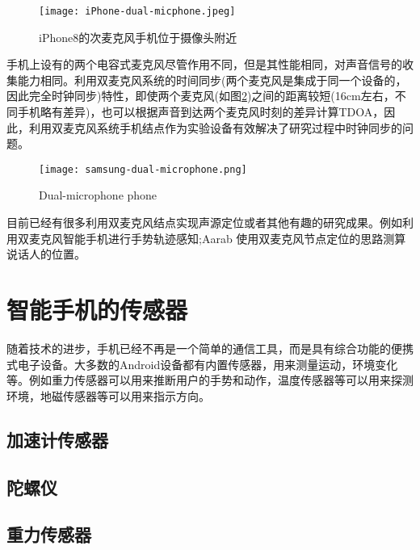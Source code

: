 \documentclass[winfonts]{njuthesis}
\begin{document}
		\begin{figure}[htbp]
			\centering
			\texttt{[image: iPhone-dual-micphone.jpeg]} 
			\caption{iPhone8的次麦克风手机位于摄像头附近}
			\label{fig: iphone-dual-microphone}
		\end{figure}
	
		手机上设有的两个电容式麦克风尽管作用不同，但是其性能相同，对声音信号的收集能力相同。利用双麦克风系统的时间同步(两个麦克风是集成于同一个设备的，因此完全时钟同步)特性，即使两个麦克风(如图\ref{fig: samsung-dual-microphone})之间的距离较短(16cm左右，不同手机略有差异)，也可以根据声音到达两个麦克风时刻的差异计算TDOA，因此，利用双麦克风系统手机结点作为实验设备有效解决了研究过程中时钟同步的问题。
		
		\begin{figure}[htbp]
			\centering
			\texttt{[image: samsung-dual-microphone.png]} 
			\caption{Dual-microphone phone}
			\label{fig: samsung-dual-microphone}
		\end{figure}
	
		目前已经有很多利用双麦克风结点实现声源定位或者其他有趣的研究成果。例如利用双麦克风智能手机进行手势轨迹感知\cite{VSkin};Aarab 使用双麦克风节点定位的思路测算说话人的位置\cite{DMArrays}。
		
	\section{智能手机的传感器}
	
		随着技术的进步，手机已经不再是一个简单的通信工具，而是具有综合功能的便携式电子设备。大多数的Android设备都有内置传感器，用来测量运动，环境变化等。例如重力传感器可以用来推断用户的手势和动作，温度传感器等可以用来探测环境，地磁传感器等可以用来指示方向。
		
		\subsection{加速计传感器}
		
		
			
		\subsection{陀螺仪}
		\subsection{重力传感器}
\end{document}
